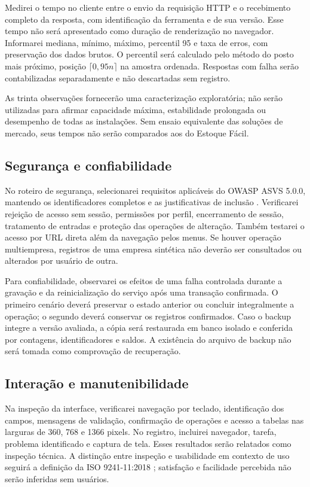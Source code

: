 Medirei o tempo no cliente entre o envio da requisição HTTP e o recebimento completo da resposta, com identificação da ferramenta e de sua versão. Esse tempo não será apresentado como duração de renderização no navegador. Informarei mediana, mínimo, máximo, percentil 95 e taxa de erros, com preservação dos dados brutos. O percentil será calculado pelo método do posto mais próximo, posição $\lceil 0{,}95n \rceil$ na amostra ordenada. Respostas com falha serão contabilizadas separadamente e não descartadas sem registro.

As trinta observações fornecerão uma caracterização exploratória; não serão utilizadas para afirmar capacidade máxima, estabilidade prolongada ou desempenho de todas as instalações. Sem ensaio equivalente das soluções de mercado, seus tempos não serão comparados aos do Estoque Fácil.

\subsection{Segurança e confiabilidade}

No roteiro de segurança, selecionarei requisitos aplicáveis do OWASP ASVS 5.0.0, mantendo os identificadores completos e as justificativas de inclusão \cite{OWASPASVS2025}. Verificarei rejeição de acesso sem sessão, permissões por perfil, encerramento de sessão, tratamento de entradas e proteção das operações de alteração. Também testarei o acesso por URL direta além da navegação pelos menus. Se houver operação multiempresa, registros de uma empresa sintética não deverão ser consultados ou alterados por usuário de outra.

Para confiabilidade, observarei os efeitos de uma falha controlada durante a gravação e da reinicialização do serviço após uma transação confirmada. O primeiro cenário deverá preservar o estado anterior ou concluir integralmente a operação; o segundo deverá conservar os registros confirmados. Caso o backup integre a versão avaliada, a cópia será restaurada em banco isolado e conferida por contagens, identificadores e saldos. A existência do arquivo de backup não será tomada como comprovação de recuperação.

\subsection{Interação e manutenibilidade}

Na inspeção da interface, verificarei navegação por teclado, identificação dos campos, mensagens de validação, confirmação de operações e acesso a tabelas nas larguras de 360, 768 e 1366 pixels. No registro, incluirei navegador, tarefa, problema identificado e captura de tela. Esses resultados serão relatados como inspeção técnica. A distinção entre inspeção e usabilidade em contexto de uso seguirá a definição da ISO 9241-11:2018 \cite{ISO9241_11}; satisfação e facilidade percebida não serão inferidas sem usuários.

